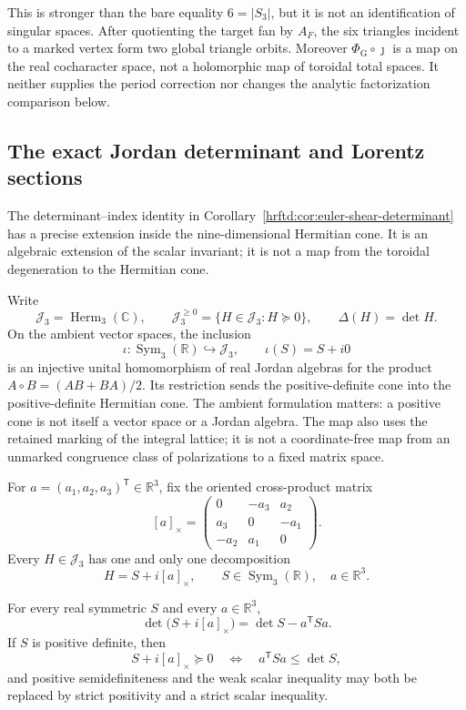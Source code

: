 This is stronger than the bare equality \(6=|S_3|\), but it is not an
identification of singular spaces.  After quotienting the target fan by
\(A_F\), the six triangles incident to a marked vertex form two global
triangle orbits.  Moreover \(\Phi_{\mathrm G}\circ\jmath\) is a map on the
real cocharacter space, not a holomorphic map of toroidal total spaces.
It neither supplies the period correction nor changes the analytic
factorization comparison below.

\subsection{The exact Jordan determinant and Lorentz sections}
\label{subsec:teb-jordan-lorentz-sections}

The determinant--index identity in
Corollary~\ref{hrftd:cor:euler-shear-determinant} has a precise extension
inside the nine-dimensional Hermitian cone.  It is an algebraic extension of
the scalar invariant; it is not a map from the toroidal degeneration to the
Hermitian cone.

Write
\[
 \mathcal J_3=\operatorname{Herm}_3(\mathbb C),\qquad
 \mathcal J_3^{\geq0}=\{H\in\mathcal J_3:H\succeq0\},
 \qquad \Delta(H)=\det H.
\]
On the ambient vector spaces, the inclusion
\[
 \iota:\operatorname{Sym}_3(\mathbb R)\hookrightarrow\mathcal J_3,
 \qquad \iota(S)=S+i0                                      \tag{TEB.45g}
\]
is an injective unital homomorphism of real Jordan algebras for the product
\(A\circ B=(AB+BA)/2\).  Its restriction sends the positive-definite cone
into the positive-definite Hermitian cone.  The ambient formulation matters:
a positive cone is not itself a vector space or a Jordan algebra.  The map
also uses the retained marking of the integral lattice; it is not a
coordinate-free map from an unmarked congruence class of polarizations to a
fixed matrix space.

For \(a=(a_1,a_2,a_3)^{\mathsf T}\in\mathbb R^3\), fix the oriented
cross-product matrix
\[
 [a]_{\times}=
 \begin{pmatrix}
  0&-a_3&a_2\\
  a_3&0&-a_1\\
  -a_2&a_1&0
 \end{pmatrix}.                                           \tag{TEB.45h}
\]
Every \(H\in\mathcal J_3\) has one and only one decomposition
\[
 H=S+i[a]_{\times},\qquad
 S\in\operatorname{Sym}_3(\mathbb R),\quad a\in\mathbb R^3. \tag{TEB.45i}
\]

\begin{theorem}
\label{thm:teb-hermitian-determinant-splitting}
For every real symmetric \(S\) and every \(a\in\mathbb R^3\),
\[
 \boxed{\det\bigl(S+i[a]_{\times}\bigr)
        =\det S-a^{\mathsf T}Sa.}                         \tag{TEB.45j}
\]
If \(S\) is positive definite, then
\[
 S+i[a]_{\times}\succeq0
 \quad\Longleftrightarrow\quad
 a^{\mathsf T}Sa\leq\det S,                              \tag{TEB.45k}
\]
and positive semidefiniteness and the weak scalar inequality may both be
replaced by strict positivity and a strict scalar inequality.
\end{theorem}

